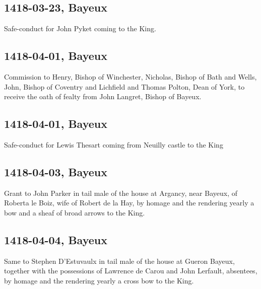 \documentclass[a4paper,12pt,twoside]{book}
\begin{document}
                
                \subsection{1418-03-23, Bayeux}
                
                
                  Safe-conduct for John Pyket coming to the King.
               
                
                \subsection{1418-04-01, Bayeux}
                
                
                  Commission to Henry, Bishop of Winchester, Nicholas, Bishop of Bath and Wells, John, Bishop of Coventry and Lichfield and Thomas Polton, Dean of York, to receive the oath of fealty from John Langret, Bishop of Bayeux.
               
                
                \subsection{1418-04-01, Bayeux}
                
                
                  Safe-conduct for Lewis Thesart coming from Neuilly castle to the King
               
                
                \subsection{1418-04-03, Bayeux}
                
                
                  Grant to John Parker in tail male of the house at Argancy, near Bayeux, of Roberta le Boiz, wife of Robert de la Hay, by homage and the rendering yearly a bow and a sheaf of broad arrows to the King.
               
                
                \subsection{1418-04-04, Bayeux}
                
                
                  Same to Stephen D’Estuvaulx in tail male of the house at Gueron Bayeux, together with the possessions of Lawrence de Carou and John Lerfault, absentees, by homage and the rendering yearly a cross bow to the King.
               
\end{document}
